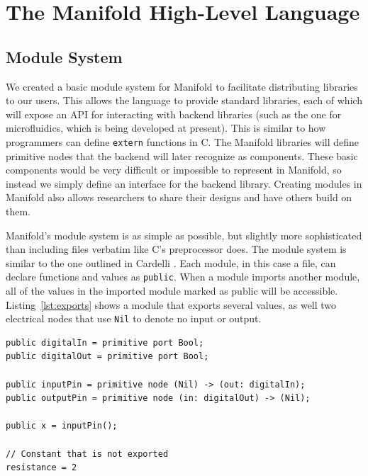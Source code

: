 \section{The Manifold High-Level Language}

\subsection{Module System}

We created a basic module system for Manifold to facilitate
distributing libraries to our users. This allows the language to provide standard
libraries, each of which will expose an API for interacting with backend
libraries (such as the one for microfluidics, which is being developed at present). This is similar to how programmers can define
\texttt{extern} functions in C. The Manifold libraries will define primitive
nodes that the backend will later recognize as components. These basic
components would be very difficult or impossible to represent in Manifold, so
instead we simply define an interface for the backend library. Creating
modules in Manifold also allows researchers to share their designs and have
others build on them.

Manifold's module system is as simple as possible, but slightly more
sophisticated than including files verbatim like C's preprocessor does.
The module system is similar to the one outlined in Cardelli
\cite{Cardelli:1997:PFL:263699.263735}. Each module, in this case a file, can
declare functions and values as \texttt{public}. When a module imports another
module, all of the values in the imported module marked as public will be
accessible. Listing~\ref{lst:exports} shows a module that exports several values, as well two
electrical nodes that use \texttt{Nil} to denote no input or output.

\begin{lstlisting}[label=lst:exports, caption=Exported values in a Manifold file]
public digitalIn = primitive port Bool;
public digitalOut = primitive port Bool;

public inputPin = primitive node (Nil) -> (out: digitalIn);
public outputPin = primitive node (in: digitalOut) -> (Nil);

public x = inputPin();

// Constant that is not exported
resistance = 2
\end{lstlisting}

